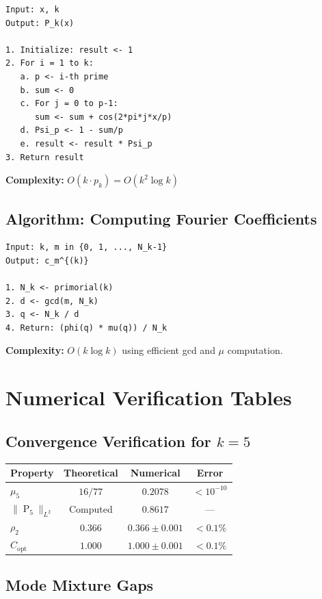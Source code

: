 ﻿\documentclass[12pt,a4paper]{report}
\theoremstyle{plain}
\theoremstyle{definition}
\DeclareMathOperator{\Pk}{P}
\begin{document}
\begin{verbatim}
Input: x, k
Output: P_k(x)

1. Initialize: result <- 1
2. For i = 1 to k:
   a. p <- i-th prime
   b. sum <- 0
   c. For j = 0 to p-1:
      sum <- sum + cos(2*pi*j*x/p)
   d. Psi_p <- 1 - sum/p
   e. result <- result * Psi_p
3. Return result
\end{verbatim}

\textbf{Complexity:} $O(k \cdot p_k) = O(k^2 \log k)$

\section{Algorithm: Computing Fourier Coefficients}

\begin{verbatim}
Input: k, m in {0, 1, ..., N_k-1}
Output: c_m^{(k)}

1. N_k <- primorial(k)
2. d <- gcd(m, N_k)
3. q <- N_k / d
4. Return: (phi(q) * mu(q)) / N_k
\end{verbatim}

\textbf{Complexity:} $O(k\log k)$ using efficient gcd and $\mu$ computation.

\chapter{Numerical Verification Tables}
\label{app:numerics}

\section{Convergence Verification for $k=5$}

\begin{center}
\begin{tabular}{lccc}
\toprule
\textbf{Property} & \textbf{Theoretical} & \textbf{Numerical} & \textbf{Error} \\
\midrule
$\mu_5$ & $16/77$ & $0.2078$ & $< 10^{-10}$ \\
$\|\Pk_5\|_{L^2}$ & Computed & $0.8617$ & --- \\
$\rho_2$ & $0.366$ & $0.366 \pm 0.001$ & $< 0.1\%$ \\
$C_{\text{opt}}$ & $1.000$ & $1.000 \pm 0.001$ & $< 0.1\%$ \\
\bottomrule
\end{tabular}
\end{center}

\section{Mode Mixture Gaps}
\end{document}
